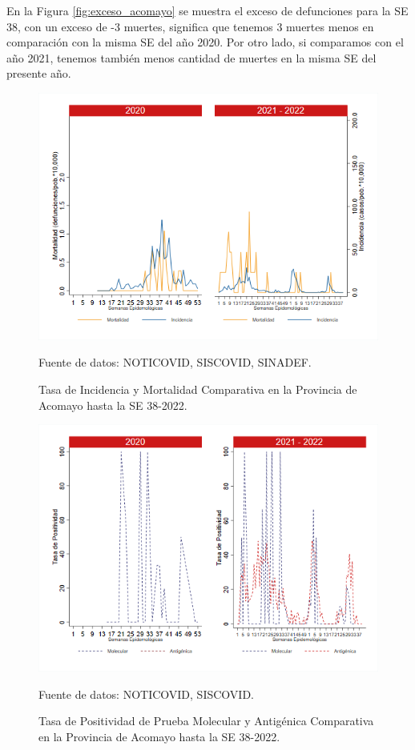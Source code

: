 \documentclass[12pt,a4paper,openany]{book}
\begin{document}
	En la Figura \ref{fig:exceso_acomayo} se muestra el exceso de defunciones para la SE 38, con un exceso de -3 muertes, significa que tenemos 3 muertes menos en comparación con la misma SE del año 2020. Por otro lado, si comparamos con el año 2021, tenemos también menos cantidad de muertes en la misma SE del presente año.
	\begin{figure}[h]
		\caption{Tasa de Incidencia y Mortalidad Comparativa en la Provincia de Acomayo hasta la SE 38-2022.}\label{fig:inc_mort_acomayo}
		\begin{center}
			\includegraphics[width=0.70\linewidth]{../figuras/incidencia_mortalidad_20_21_1.png}
		\end{center}
		{\footnotesize {Fuente de datos: NOTICOVID, SISCOVID, SINADEF.}}
	\end{figure}
	
	\begin{figure}[h]
		\caption{Tasa de Positividad de Prueba Molecular y Antigénica Comparativa en la Provincia de Acomayo hasta la SE 38-2022. }\label{fig:positividad_acomayo}
		\begin{center}
			\includegraphics[width=0.7\linewidth]{../figuras/positividad_20_21_1.png}
		\end{center}
		{\footnotesize {Fuente de datos: NOTICOVID, SISCOVID.}}
	\end{figure}
	
\end{document}
